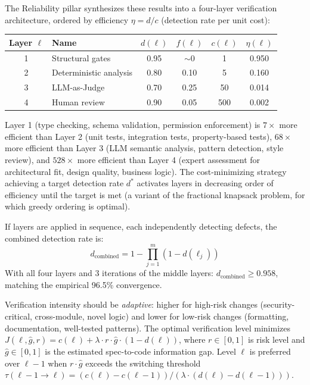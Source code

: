 The Reliability pillar synthesizes these results into a four-layer verification architecture, ordered by efficiency $\eta = d/c$ (detection rate per unit cost):

\begin{center}
\small
\begin{tabular}{clcccc}
\toprule
Layer $\ell$ & Name & $d(\ell)$ & $f(\ell)$ & $c(\ell)$ & $\eta(\ell)$ \\
\midrule
1 & Structural gates & 0.95 & ${\sim}0$ & 1 & 0.950 \\
2 & Deterministic analysis & 0.80 & 0.10 & 5 & 0.160 \\
3 & LLM-as-Judge & 0.70 & 0.25 & 50 & 0.014 \\
4 & Human review & 0.90 & 0.05 & 500 & 0.002 \\
\bottomrule
\end{tabular}
\end{center}

Layer 1 (type checking, schema validation, permission enforcement) is $7\times$ more efficient than Layer 2 (unit tests, integration tests, property-based tests), $68\times$ more efficient than Layer 3 (LLM semantic analysis, pattern detection, style review), and $528\times$ more efficient than Layer 4 (expert assessment for architectural fit, design quality, business logic). The cost-minimizing strategy achieving a target detection rate $d^*$ activates layers in decreasing order of efficiency until the target is met (a variant of the fractional knapsack problem, for which greedy ordering is optimal).

If layers are applied in sequence, each independently detecting defects, the combined detection rate is:
\begin{equation}
    d_{\text{combined}} = 1 - \prod_{j=1}^{m} (1 - d(\ell_j))
\end{equation}
With all four layers and 3 iterations of the middle layers: $d_{\text{combined}} \geq 0.958$, matching the empirical 96.5\% convergence.

Verification intensity should be \emph{adaptive}: higher for high-risk changes (security-critical, cross-module, novel logic) and lower for low-risk changes (formatting, documentation, well-tested patterns). The optimal verification level minimizes $J(\ell, \hat{g}, r) = c(\ell) + \lambda \cdot r \cdot \hat{g} \cdot (1 - d(\ell))$, where $r \in [0,1]$ is risk level and $\hat{g} \in [0,1]$ is the estimated spec-to-code information gap. Level $\ell$ is preferred over $\ell - 1$ when $r \cdot \hat{g}$ exceeds the switching threshold $\tau(\ell{-}1 \to \ell) = (c(\ell) - c(\ell{-}1)) / (\lambda \cdot (d(\ell) - d(\ell{-}1)))$.

